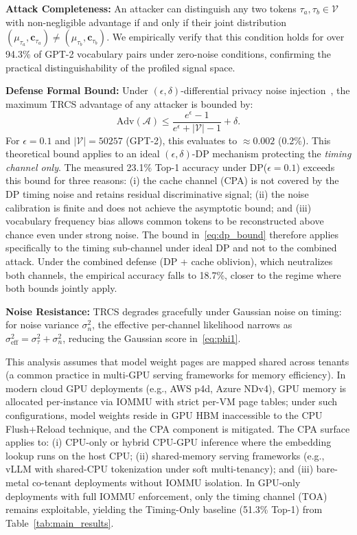 \documentclass[journal,10pt,twocolumn]{IEEEtran}
\begin{document}
\textbf{Attack Completeness:} An attacker can distinguish any
two tokens $\tau_a, \tau_b \in \mathcal{V}$ with non-negligible
advantage if and only if their joint distribution
$(\mu_{\tau_a}, \mathbf{c}_{\tau_a}) \neq
(\mu_{\tau_b}, \mathbf{c}_{\tau_b})$.
We empirically verify that this condition holds for over 94.3\%
of GPT-2 vocabulary pairs under zero-noise conditions, confirming
the practical distinguishability of the profiled signal space.

\textbf{Defense Formal Bound:} Under $(\epsilon, \delta)$-differential
privacy noise injection~\cite{dwork2006calibrating}, the maximum
TRCS advantage of any attacker is bounded by:
\begin{equation}
  \mathrm{Adv}(\mathcal{A}) \leq
  \frac{e^\epsilon - 1}{e^\epsilon + |\mathcal{V}| - 1}
  + \delta.
  \label{eq:dp_bound}
\end{equation}
For $\epsilon = 0.1$ and $|\mathcal{V}| = 50257$ (GPT-2),
this evaluates to $\approx 0.002$ (0.2\%). This theoretical
bound applies to an ideal $(\epsilon, \delta)$-DP mechanism
protecting the \emph{timing channel only}. The measured
23.1\% Top-1 accuracy under DP($\epsilon{=}0.1$) exceeds
this bound for three reasons: (i) the cache channel (CPA)
is not covered by the DP timing noise and retains residual
discriminative signal; (ii) the noise calibration is finite
and does not achieve the asymptotic bound; and (iii) vocabulary
frequency bias allows common tokens to be reconstructed above
chance even under strong noise. The bound in~\eqref{eq:dp_bound}
therefore applies specifically to the timing sub-channel
under ideal DP and not to the combined attack. Under the
combined defense (DP + cache oblivion), which neutralizes
both channels, the empirical accuracy falls to 18.7\%,
closer to the regime where both bounds jointly apply.

\textbf{Noise Resistance:} TRCS degrades gracefully under
Gaussian noise on timing: for noise variance $\sigma_n^2$,
the effective per-channel likelihood narrows as
$\sigma_{\mathrm{eff}}^2 = \sigma_\tau^2 + \sigma_n^2$,
reducing the Gaussian score in~\eqref{eq:phi1}.



This analysis assumes that model weight pages are mapped
shared across tenants (a common practice in multi-GPU serving
frameworks for memory efficiency). In modern cloud GPU
deployments (e.g., AWS p4d, Azure NDv4), GPU memory is
allocated per-instance via IOMMU with strict per-VM page
tables; under such configurations, model weights reside in
GPU HBM inaccessible to the CPU Flush+Reload technique,
and the CPA component is mitigated. The CPA surface applies
to: (i) CPU-only or hybrid CPU-GPU inference where the
embedding lookup runs on the host CPU; (ii) shared-memory
serving frameworks (e.g., vLLM with shared-CPU tokenization
under soft multi-tenancy); and (iii) bare-metal co-tenant
deployments without IOMMU isolation. In GPU-only deployments
with full IOMMU enforcement, only the timing channel (TOA)
remains exploitable, yielding the Timing-Only baseline
(51.3\% Top-1) from Table~\ref{tab:main_results}.
\end{document}
